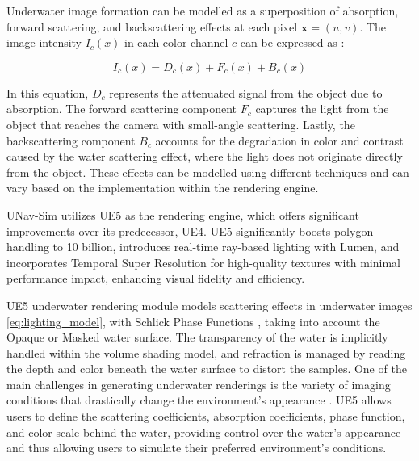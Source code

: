 Underwater image formation can be modelled as a superposition of absorption, forward scattering, and backscattering effects at each pixel $\textbf{x} = (u, v)$. The image intensity $I_c(x)$ in each color channel $c$ can be expressed as \cite{olaya}:

\begin{equation}\label{eq:lighting_model}
I_c(x) = D_c(x) + F_c(x) + B_c(x)
\end{equation}

In this equation, $D_c$ represents the attenuated signal from the object due to absorption. The forward scattering component $F_c$ captures the light from the object that reaches the camera with small-angle scattering. Lastly, the backscattering component $B_c$ accounts for the degradation in color and contrast caused by the water scattering effect, where the light does not originate directly from the object. These effects can be modelled using different techniques and can vary based on the implementation within the rendering engine.









UNav-Sim utilizes \ac{UE5} as the rendering engine, which offers significant improvements over its predecessor, \ac{UE4}. \ac{UE5} significantly boosts polygon handling to 10 billion, introduces real-time ray-based lighting with Lumen, and incorporates Temporal Super Resolution for high-quality textures with minimal performance impact, enhancing visual fidelity and efficiency. 


\ac{UE5} underwater rendering module models scattering effects in underwater images \eqref{eq:lighting_model}, with Schlick Phase Functions \cite{schlick}, taking into account the Opaque or Masked water surface. 
The transparency of the water is implicitly handled within the volume shading model, %
and refraction is managed by reading the depth and color beneath the water surface to distort the samples.  
One of the main challenges in generating underwater renderings is the variety of imaging conditions that drastically change the environment's appearance \cite{akkaynak2017space}. \ac{UE5} allows users to define the scattering coefficients, absorption coefficients, phase function, and color scale behind the water, providing control over the water's appearance and thus allowing users to simulate their preferred environment's conditions. 


